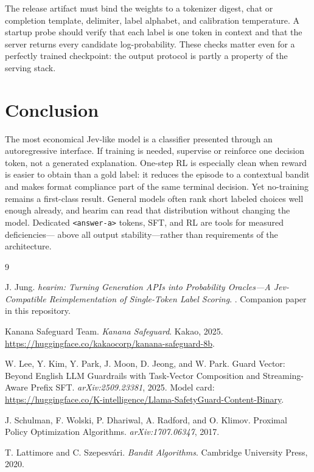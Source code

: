 \documentclass[11pt]{article}
\begin{document}
The release artifact must bind the weights to a tokenizer digest, chat or
completion template, delimiter, label alphabet, and calibration temperature.
A startup probe should verify that each label is one token in context and
that the server returns every candidate log-probability.  These checks matter
even for a perfectly trained checkpoint: the output protocol is partly a
property of the serving stack.

\section{Conclusion}

The most economical Jev-like model is a classifier presented through an
autoregressive interface.  If training is needed, supervise or reinforce one
decision token, not a generated explanation.  One-step RL is especially
clean when reward is easier to obtain than a gold label: it reduces the
episode to a contextual bandit and makes format compliance part of the same
terminal decision.  Yet no-training remains a first-class result.  General
models often rank short labeled choices well enough already, and hearim can
read that distribution without changing the model.  Dedicated
\texttt{<answer-a>} tokens, SFT, and RL are tools for measured deficiencies---
above all output stability---rather than requirements of the architecture.

\begin{thebibliography}{9}

J. Jung.
\newblock \emph{hearim: Turning Generation APIs into Probability Oracles---A
Jev-Compatible Reimplementation of Single-Token Label Scoring}.
. Companion paper in this repository.

Kanana Safeguard Team.
\newblock \emph{Kanana Safeguard}.
\newblock Kakao, 2025.
\newblock \url{https://huggingface.co/kakaocorp/kanana-safeguard-8b}.

W. Lee, Y. Kim, Y. Park, J. Moon, D. Jeong, and W. Park.
\newblock Guard Vector: Beyond English LLM Guardrails with Task-Vector
Composition and Streaming-Aware Prefix SFT.
\newblock \emph{arXiv:2509.23381}, 2025.
\newblock Model card: \url{https://huggingface.co/K-intelligence/Llama-SafetyGuard-Content-Binary}.

J. Schulman, F. Wolski, P. Dhariwal, A. Radford, and O. Klimov.
\newblock Proximal Policy Optimization Algorithms.
\newblock \emph{arXiv:1707.06347}, 2017.

T. Lattimore and C. Szepesv\'ari.
\newblock \emph{Bandit Algorithms}.
\newblock Cambridge University Press, 2020.

\end{thebibliography}
\end{document}
